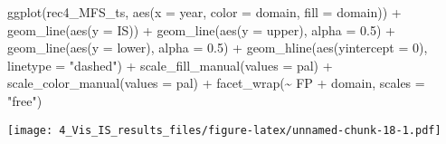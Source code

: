 \documentclass[
]{article}
\newenvironment{Shaded}{\begin{snugshade}}{\end{snugshade}}
\newcommand{\AttributeTok}[1]{\textcolor[rgb]{0.77,0.63,0.00}{#1}}
\newcommand{\DecValTok}[1]{\textcolor[rgb]{0.00,0.00,0.81}{#1}}
\newcommand{\FloatTok}[1]{\textcolor[rgb]{0.00,0.00,0.81}{#1}}
\newcommand{\FunctionTok}[1]{\textcolor[rgb]{0.00,0.00,0.00}{#1}}
\newcommand{\NormalTok}[1]{#1}
\newcommand{\SpecialCharTok}[1]{\textcolor[rgb]{0.00,0.00,0.00}{#1}}
\newcommand{\StringTok}[1]{\textcolor[rgb]{0.31,0.60,0.02}{#1}}
\begin{document}
\begin{Shaded}
\begin{Highlighting}[]
\FunctionTok{ggplot}\NormalTok{(rec4\_MFS\_ts, }\FunctionTok{aes}\NormalTok{(}\AttributeTok{x =}\NormalTok{ year, }\AttributeTok{color =}\NormalTok{ domain, }\AttributeTok{fill =}\NormalTok{ domain)) }\SpecialCharTok{+}
  \FunctionTok{geom\_line}\NormalTok{(}\FunctionTok{aes}\NormalTok{(}\AttributeTok{y =}\NormalTok{ IS)) }\SpecialCharTok{+}
  \FunctionTok{geom\_line}\NormalTok{(}\FunctionTok{aes}\NormalTok{(}\AttributeTok{y =}\NormalTok{ upper), }\AttributeTok{alpha =} \FloatTok{0.5}\NormalTok{) }\SpecialCharTok{+}
  \FunctionTok{geom\_line}\NormalTok{(}\FunctionTok{aes}\NormalTok{(}\AttributeTok{y =}\NormalTok{ lower), }\AttributeTok{alpha =} \FloatTok{0.5}\NormalTok{) }\SpecialCharTok{+}
  \FunctionTok{geom\_hline}\NormalTok{(}\FunctionTok{aes}\NormalTok{(}\AttributeTok{yintercept =} \DecValTok{0}\NormalTok{),}
             \AttributeTok{linetype =} \StringTok{"dashed"}\NormalTok{) }\SpecialCharTok{+}
    \FunctionTok{scale\_fill\_manual}\NormalTok{(}\AttributeTok{values =}\NormalTok{ pal) }\SpecialCharTok{+}
  \FunctionTok{scale\_color\_manual}\NormalTok{(}\AttributeTok{values =}\NormalTok{ pal) }\SpecialCharTok{+}
     \FunctionTok{facet\_wrap}\NormalTok{(}\SpecialCharTok{\textasciitilde{}}\NormalTok{ FP }\SpecialCharTok{+}\NormalTok{ domain, }\AttributeTok{scales =} \StringTok{"free"}\NormalTok{)}
\end{Highlighting}
\end{Shaded}

\texttt{[image: 4\_Vis\_IS\_results\_files/figure-latex/unnamed-chunk-18-1.pdf]}
\end{document}

